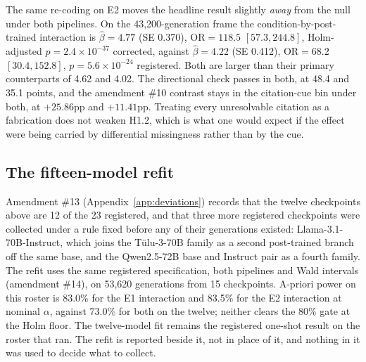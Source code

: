 The same re-coding on E2 moves the headline result slightly \emph{away} from the
null under both pipelines. On the 43,200-generation frame the
condition-by-post-trained interaction is $\hat\beta = 4.77$ (SE 0.370),
$\mathrm{OR} = 118.5$ $[57.3, 244.8]$, Holm-adjusted
$p = 2.4 \times 10^{-37}$ corrected, against $\hat\beta = 4.22$ (SE 0.412),
$\mathrm{OR} = 68.2$ $[30.4, 152.8]$, $p = 5.6 \times 10^{-24}$ registered. Both
are larger than their primary counterparts of 4.62 and 4.02. The directional
check passes in both, at 48.4 and 35.1 points, and the amendment \#10 contrast
stays in the citation-cue bin under both, at $+25.86$pp and $+11.41$pp. Treating
every unresolvable citation as a fabrication does not weaken H1.2, which is what
one would expect if the effect were being carried by differential missingness
rather than by the cue.

\subsection{The fifteen-model refit}
\label{sec:refit15}

Amendment \#13 (Appendix~\ref{app:deviations}) records that the twelve
checkpoints above are 12 of the 23 registered, and that three more registered
checkpoints were collected under a rule fixed before any of their generations
existed: Llama-3.1-70B-Instruct, which joins the Tülu-3-70B family as a second
post-trained branch off the same base, and the Qwen2.5-72B base and Instruct
pair as a fourth family. The refit uses the same registered specification, both
pipelines and Wald intervals (amendment \#14), on 53,620 generations from 15
checkpoints. A-priori power on this roster is 83.0\% for the E1 interaction and
83.5\% for the E2 interaction at nominal $\alpha$, against 73.0\% for both on
the twelve; neither clears the 80\% gate at the Holm floor. The twelve-model fit
remains the registered one-shot result on the roster that ran. The refit is
reported beside it, not in place of it, and nothing in it was used to decide
what to collect.

